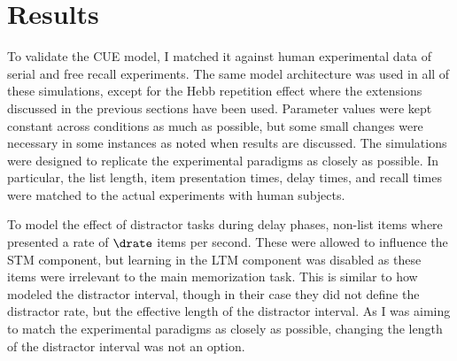 \chapter{Results}
To validate the CUE model, I matched it against human experimental data of serial and free recall experiments.
The same model architecture was used in all of these simulations, except for the Hebb repetition effect where the extensions discussed in the previous sections have been used.
Parameter values were kept constant across conditions as much as possible, but some small changes were necessary in some instances as noted when results are discussed.
The simulations were designed to replicate the experimental paradigms as closely as possible.
In particular, the list length, item presentation times, delay times, and recall times were matched to the actual experiments with human subjects.

To model the effect of distractor tasks during delay phases, non-list items where presented a rate of $\drate$ items per second.
These were allowed to influence the STM component, but learning in the LTM component was disabled as these items were irrelevant to the main memorization task.
This is similar to how \textcite{Howard2002} modeled the distractor interval, though in their case they did not define the distractor rate, but the effective length of the distractor interval.
As I was aiming to match the experimental paradigms as closely as possible, changing the length of the distractor interval was not an option.


